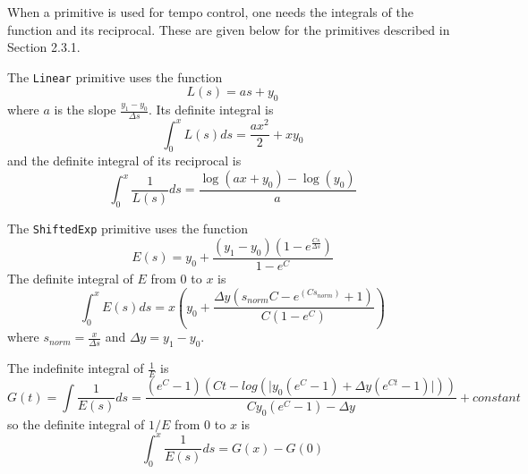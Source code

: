 \documentclass[letterpaper, 12pt]{article}
\begin{document}
When a primitive is used for tempo control,
one needs the integrals of the function and its reciprocal.
These are given below for the primitives described in Section 2.3.1.

The \texttt{Linear} primitive uses the function
$$ L(s) = as + y_0 $$
where $ a $ is the slope
$ \frac{y_1 - y_0}{\Delta s} $.
Its definite integral is
$$ \int _0^x L(s)ds = \frac{ax^2}{2} + xy_0 $$
and the definite integral of its reciprocal is
$$ \int _0^x \frac{1}{L(s)}ds = \frac{\log(ax + y_0)-\log(y_0)}{a} $$

The \texttt{ShiftedExp} primitive uses the function
$$ E(s) = y_0 + \frac{(y_1-y_0)(1-e^{\frac{Cs}{\Delta s}})}{1-e^C} $$
The definite integral of $ E $ from 0 to $ x $ is
$$ \int_0^x E(s)ds = x(y_0 + \frac{\Delta y(s_{norm} C - e^{(Cs_{norm})} + 1)}{C(1-e^C)}) $$
where
$ s_{norm} = \frac{x}{\Delta s} $
and
$ \Delta y = y_1 - y_0 $.

The indefinite integral of
$ \frac{1}{E} $
is
$$ G(t) = \int \frac{1}{E(s)}ds = \frac{(e^C - 1)(Ct - log(\lvert y_0(e^C-1) + \Delta y(e^{Ct} - 1)\rvert ))}{Cy_0(e^C-1) - \Delta y} + constant $$
so the definite integral of $ 1/E $ from 0 to $ x $ is
$$ \int_0^x \frac{1}{E(s)}ds = G(x) - G(0) $$



\end{document}
